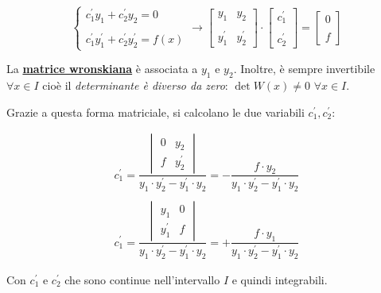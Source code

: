 \documentclass[a4paper]{article}
\begin{document}
	\begin{equation*}
		\begin{cases}
			c_{1}^{'}y_{1} + c_{2}^{'}y_{2} = 0 \\
			\\
			c_{1}^{'}y_{1}^{'} + c_{2}^{'}y_{2}^{'} = f\left(x\right)
		\end{cases}
		\longrightarrow
		\begin{bmatrix}
			y_{1} 		& y_{2} 	\\
						&			\\
			y_{1}^{'}	& y_{2}^{'}
		\end{bmatrix}
		\cdot
		\begin{bmatrix}
			c_{1}^{'} \\
			\\
			c_{2}^{'}
		\end{bmatrix}
		=
		\begin{bmatrix}
			0 \\
			\\
			f
		\end{bmatrix}
	\end{equation*}
	
	\noindent
	La \textbf{\underline{matrice wronskiana}} è associata a $y_{1}$ e $y_{2}$. Inoltre, è sempre invertibile $\forall x \in I$ cioè il \emph{determinante è diverso da zero}: $\det W\left(x\right) \ne 0$ $\forall x \in I$.\newline
	
	\noindent
	Grazie a questa forma matriciale, si calcolano le due variabili $c_{1}^{'}, c_{2}^{'}$:
	
	\begin{gather*}
		c_{1}^{'} = \dfrac{
		\begin{vmatrix}
			0	&	y_{2} 		\\
			f	& 	y_{2}^{'}
		\end{vmatrix}
		}{y_{1} \cdot y_{2}^{'} - y_{1}^{'} \cdot y_{2}}
		=
		- \dfrac{f \cdot y_{2}}{y_{1} \cdot y_{2}^{'} - y_{1}^{'} \cdot y_{2}}
		\\
		\\
		c_{1}^{'} = \dfrac{
		\begin{vmatrix}
			y_{1}		&	0	\\
			y_{1}^{'}	& 	f
		\end{vmatrix}
		}{y_{1} \cdot y_{2}^{'} - y_{1}^{'} \cdot y_{2}}
		=
		+ \dfrac{f \cdot y_{1}}{y_{1} \cdot y_{2}^{'} - y_{1}^{'} \cdot y_{2}}
	\end{gather*}

	\noindent
	Con $c_{1}^{'}$ e $c_{2}^{'}$ che sono continue nell'intervallo $I$ e quindi integrabili.
	
\end{document}
